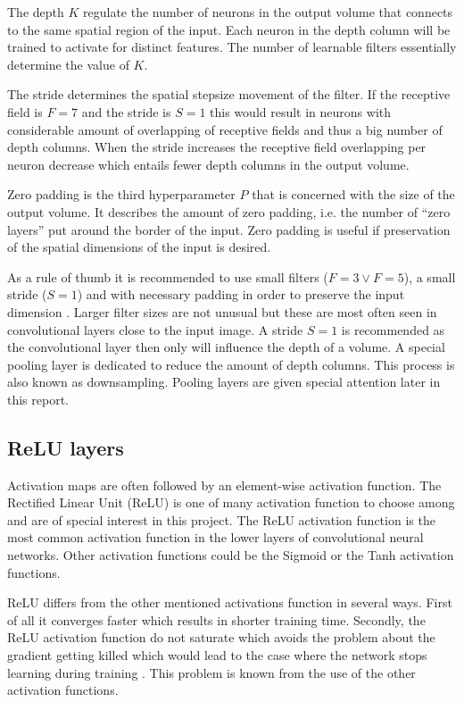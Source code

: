 The depth $K$ regulate the number of neurons in the output volume that connects to the same spatial region of the input. Each neuron in the depth column will be trained to activate for distinct features. The number of learnable filters essentially determine the value of $K$.

The stride determines the spatial stepsize movement of the filter. If the
receptive field is $F = 7$ and the stride is $S = 1$ this would result in
neurons with considerable amount of overlapping of receptive fields and thus a
big number of depth columns. When the stride increases the receptive field
overlapping per neuron decrease which entails fewer depth columns in the output
volume.

Zero padding is the third hyperparameter $P$ that is concerned with the size of
the output volume. It describes the amount of zero padding, i.e. the number of
``zero layers'' put around the border of the input. Zero padding is useful if
preservation of the spatial dimensions of the input is desired.

As a rule of thumb it is recommended to use small filters ($F=3 \vee F=5$), a
small stride ($S=1$) and with necessary padding in order to preserve
the input dimension \cite{cs231n}. Larger filter sizes are not unusual but these
are most often seen in convolutional layers close to the input image. A stride
$S=1$ is recommended as the convolutional layer then only will influence the
depth of a volume. A special pooling layer is dedicated to reduce the amount of
depth columns. This process is also known as downsampling. Pooling layers are
given special attention later in this report.

\subsection{ReLU layers} %
\label{sub:relu_layers}

Activation maps are often followed by an element-wise activation function. The
Rectified Linear Unit (ReLU) is one of many activation function to choose among
and are of special interest in this project. The ReLU activation function is the
most common activation function in the lower layers of convolutional neural
networks. Other activation functions could be the Sigmoid or the Tanh activation
functions.

ReLU differs from the other mentioned activations function in several ways.
First of all it converges faster which results in shorter training time.
Secondly, the ReLU activation function do not saturate which avoids the problem
about the gradient getting killed which would lead to the case where the network
stops learning during training \cite{cs231n}. This problem is known from the use
of the other activation functions.

